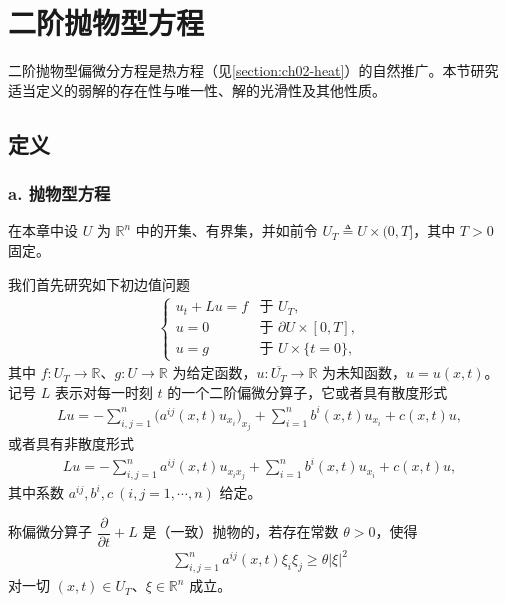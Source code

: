 \documentclass[../../main.tex]{subfiles}
\begin{document}
\section{二阶抛物型方程}\label{section:ch07-1-二阶抛物型方程}

二阶抛物型偏微分方程是热方程（见\cref{section:ch02-heat}）的自然推广。本节研究适当定义的弱解的存在性与唯一性、解的光滑性及其他性质。

\subsection{定义}\label{subsection:ch07-1-1-定义}

\subsubsection*{a. 抛物型方程}

在本章中设 $U$ 为 $\mathbb{R}^n$ 中的开集、有界集，并如前令 $U_T \triangleq U\times(0,T]$，其中 $T>0$ 固定。

我们首先研究如下初边值问题
\begin{align}
\begin{cases}
u_t + Lu = f & \text{于 } U_T,\\
u = 0 & \text{于 } \partial U\times[0,T],\\
u = g & \text{于 } U\times\{t=0\},
\end{cases}\label{align:ch07-1-eq01}
\end{align}
其中 $f:U_T\to\mathbb{R}$、$g:U\to\mathbb{R}$ 为给定函数，$u:\overline{U_T}\to\mathbb{R}$ 为未知函数，$u=u(x,t)$。记号 $L$ 表示对每一时刻 $t$ 的一个二阶偏微分算子，它或者具有散度形式
\begin{align}
Lu = -\sum_{i,j=1}^n \bigl(a^{ij}(x,t)u_{x_i}\bigr)_{x_j} + \sum_{i=1}^n b^i(x,t)u_{x_i} + c(x,t)u,\label{align:ch07-1-eq02}
\end{align}
或者具有非散度形式
\begin{align}
Lu = -\sum_{i,j=1}^n a^{ij}(x,t)u_{x_ix_j} + \sum_{i=1}^n b^i(x,t)u_{x_i} + c(x,t)u,\label{align:ch07-1-eq03}
\end{align}
其中系数 $a^{ij},b^i,c\ (i,j=1,\cdots,n)$ 给定。

\begin{definition}\label{definition:ch07-1-抛物算子}
称偏微分算子 $\dfrac{\partial}{\partial t}+L$ 是（一致）抛物的，若存在常数 $\theta>0$，使得
\begin{align}
\sum_{i,j=1}^n a^{ij}(x,t)\xi_i\xi_j \geqslant \theta|\xi|^2\label{align:ch07-1-eq04}
\end{align}
对一切 $(x,t)\in U_T$、$\xi\in\mathbb{R}^n$ 成立。
\end{definition}
\end{document}
